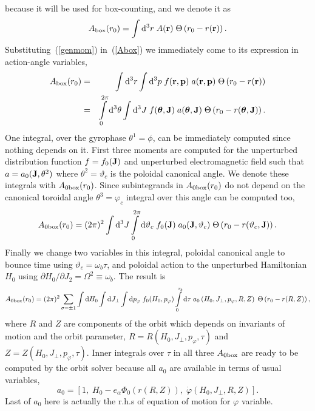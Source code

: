 \documentclass[preprint,prb,aps]{revtex4-1}
\newcommand{\be}[1]{\begin{equation} \label{#1}}
\newcommand{\ee}{\end{equation}}
\newcommand{\bea}[1]{\begin{eqnarray} \label{#1}}
\newcommand{\eea}{\end{eqnarray}}
\newcommand{\eq}[1]{(\ref{#1})}
\newcommand{\br}{{\bf r}}
\newcommand{\bp}{{\bf p}}
\newcommand{\bJ}{{\bf J}}
\newcommand{\btheta}{{\boldsymbol\theta}}
\newcommand{\rd}{{\rm d}}
\begin{document}
because it will be used for box-counting, and we denote it as
\be{Abox}
A_{\rm box}(r_0)=\int\limits\rd^3 r \; A(\br)\;\Theta\left(r_0-r(\br)\right).
\ee
Substituting~\eq{genmom} in~\eq{Abox} we immediately come to its expression in action-angle
variables,
\bea{Abox_actang}
A_{\rm box}(r_0)
&=& \int\limits\rd^3 r\int \rd^3 p\; f(\br,\bp)\; a(\br,\bp)\;
\Theta\left(r_0-r(\br)\right)
\nonumber \\
&=& \int\limits_0^{2\pi}\rd^3 \theta \int \rd^3 J\; f(\btheta,\bJ)\; a(\btheta,\bJ)\;
\Theta\left(r_0-r(\btheta,\bJ)\right).
\eea
One integral, over the gyrophase $\theta^1=\phi$, can be immediately computed since nothing
depends on it.
First three moments are computed for the unperturbed distribution function $f=f_0(\bJ)$
and unperturbed electromagnetic field such that $a=a_0(\bJ,\theta^2)$ where
$\theta^2=\vartheta_c$ is the poloidal canonical angle. We denote these integrals
with $A_{0\rm box}(r_0)$.
Since subintegrands in $A_{0\rm box}(r_0)$ do not
depend on the canonical toroidal angle $\theta^3=\varphi_c$ integral over this angle 
can be computed too,
\be{Abox_0}
A_{0\rm box}(r_0)=(2\pi)^2\int \rd^3 J \int\limits_0^{2\pi}\rd \vartheta_c\;
f_0(\bJ)\; a_0(\bJ,\vartheta_c)\;
\Theta\left(r_0-r(\vartheta_c,\bJ)\right).
\ee
Finally we change two variables in this integral, poloidal canonical angle to bounce time
using $\vartheta_c=\omega_b \tau$, and poloidal action to the unperturbed Hamiltonian $H_0$ using
$\partial H_0 / \partial J_2=\Omega^2\equiv \omega_b$. The result is
\be{Abox_0_noncan}
A_{0\rm box}(r_0)=(2\pi)^2\sum_{\sigma=\pm 1}
\int \rd H_0\int\rd J_\perp\int\rd p_\varphi 
\;f_0(H_0,p_\varphi)
\int\limits_0^{\tau_b}\rd \tau\;
a_0\left(H_0,J_\perp,p_\varphi,R,Z\right)\;
\Theta\left(r_0-r(R,Z)\right),
\ee
where $R$ and $Z$ are components of the orbit which depends on invariants of motion 
and the orbit parameter,
\mbox{$R=R(H_0,J_\perp,p_\varphi,\tau)$} and \mbox{$Z=Z(H_0,J_\perp,p_\varphi,\tau)$}.
Inner integrals over $\tau$ in all three $A_{0\rm box}$ are ready to be computed by the orbit solver 
because all $a_0$ are available in terms of usual variables,
\be{a0}
a_0=\left[1,\; H_0-e_\alpha\Phi_0\left(r(R,Z)\right),\; \dot \varphi(H_0,J_\perp,R,Z)\right].
\ee
Last of $a_0$ here is actually the r.h.s of equation of motion for $\varphi$ variable.
\end{document}
